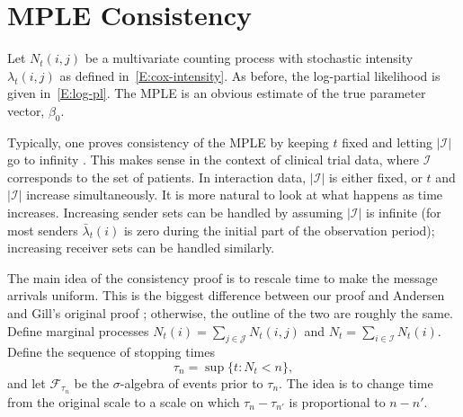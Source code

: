 \documentclass[aoas,preprint]{imsart}
\begin{document}
\section{MPLE Consistency}\label{S:MPLE-consistency}

Let $N_t(i,j)$ be a multivariate counting process with stochastic
intensity $\lambda_t(i,j)$ as defined in~\eqref{E:cox-intensity}.
As before, the log-partial likelihood is given in~\eqref{E:log-pl}.
The MPLE is an obvious estimate of the true parameter vector, $\beta_0$.

Typically, one proves consistency of the MPLE by keeping $t$ fixed
and letting $|\mathcal{I}|$ go to infinity
\cite{andersen1993statistical,andersen1982cox,cook2007statistical,fleming1991counting,
martinussen2006dynamic}.  This makes sense in the context of clinical trial
data, where $\mathcal{I}$ corresponds to the set of patients.  In interaction
data, $|\mathcal{I}|$ is either fixed, or $t$ and $|\mathcal{I}|$ increase
simultaneously.  It is more natural to look at what happens as time increases.
Increasing sender sets can be handled by assuming $|\mathcal{I}|$ is infinite
(for most senders $\bar \lambda_t(i)$ is zero during the initial
part of the observation period); increasing receiver sets can be
handled similarly.


The main idea of the consistency proof is to rescale time to make the message
arrivals uniform.  This is the biggest difference between our proof and
Andersen and Gill's original proof \cite{andersen1982cox}; otherwise, the
outline of the two are roughly the same.  
Define marginal processes
\(
    N_t(i) = \sum_{j \in \mathcal{J}} N_t(i,j)
\)
and
\(
    N_t = \sum_{i \in \mathcal{I}} N_t(i).
\)
Define the sequence of stopping
times
\begin{equation}\label{E:message-times}
    \tau_n = \sup\{ t : N_t < n \},
\end{equation}
and let $\mathcal{F}_{\tau_n}$ be the $\sigma$-algebra of events prior to
$\tau_n$. The idea is to change time from the original scale to a scale on
which $\tau_{n} - \tau_{n'}$ is proportional to $n - n'$.
\end{document}
